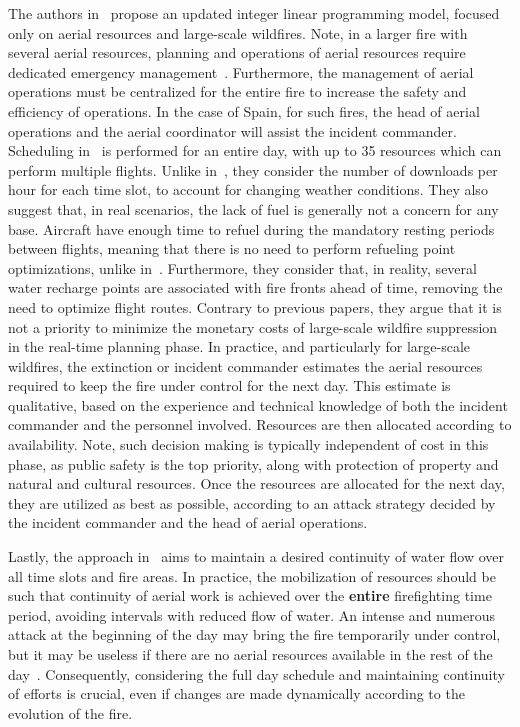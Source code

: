 The authors in~\cite{SkorinKapov/ILP} propose an updated integer linear programming model, focused only on aerial resources and large-scale wildfires.
Note, in a larger fire with several aerial resources, planning and operations of aerial resources require dedicated emergency management~\cite{INFOCACongreso2017}.
Furthermore, the management of aerial operations must be centralized for the entire fire to increase the safety and efficiency of operations.
In the case of Spain, for such fires, the head of aerial operations and the aerial coordinator will assist the incident commander.
Scheduling in~\cite{SkorinKapov/ILP} is performed for an entire day, with up to 35 resources which can perform multiple flights.
Unlike in~\cite{Veiga/AerialScheduler}, they consider the number of downloads per hour for each time slot, to account for changing weather conditions.
They also suggest that, in real scenarios, the lack of fuel is generally not a concern for any base.
Aircraft have enough time to refuel during the mandatory resting periods between flights, meaning that there is no need to perform refueling point optimizations, unlike in~\cite{Veiga/AerialScheduler}. 
Furthermore, they consider that, in reality, several water recharge points are associated with fire fronts ahead of time, removing the need to optimize flight routes.
Contrary to previous papers, they argue that it is not a priority to minimize the monetary costs of large-scale wildfire suppression in the real-time planning phase.
In practice, and particularly for large-scale wildfires, the extinction or incident commander estimates the aerial resources required to keep the fire under control for the next day.
This estimate is qualitative, based on the experience and technical knowledge of both the incident commander and the personnel involved.
Resources are then allocated according to availability.
Note, such decision making is typically independent of cost in this phase, as public safety is the top priority, along with protection of property and natural and cultural resources.
Once the resources are allocated for the next day, they are utilized as best as possible, according to an attack strategy decided by the incident commander and the head of aerial operations.

Lastly, the approach in~\cite{SkorinKapov/ILP} aims to maintain a desired continuity of water flow over all time slots and fire areas.
In practice, the mobilization of resources should be such that continuity of aerial work is achieved over the \textbf{entire} firefighting time period, avoiding intervals with reduced flow of water.
An intense and numerous attack at the beginning of the day may bring the fire temporarily under control, but it may be useless if there are no aerial resources available in the rest of the day~\cite{INFOCACongreso2017}.
Consequently, considering the full day schedule and maintaining continuity of efforts is crucial, even if changes are made dynamically according to the evolution of the fire.   

